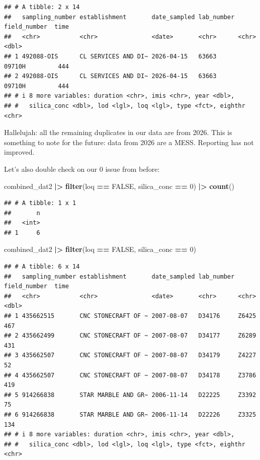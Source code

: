 \documentclass[
]{article}
\newenvironment{Shaded}{\begin{snugshade}}{\end{snugshade}}
\newcommand{\ConstantTok}[1]{\textcolor[rgb]{0.56,0.35,0.01}{#1}}
\newcommand{\DecValTok}[1]{\textcolor[rgb]{0.00,0.00,0.81}{#1}}
\newcommand{\FunctionTok}[1]{\textcolor[rgb]{0.13,0.29,0.53}{\textbf{#1}}}
\newcommand{\NormalTok}[1]{#1}
\newcommand{\SpecialCharTok}[1]{\textcolor[rgb]{0.81,0.36,0.00}{\textbf{#1}}}
\begin{document}
\begin{verbatim}
## # A tibble: 2 x 14
##   sampling_number establishment       date_sampled lab_number field_number  time
##   <chr>           <chr>               <date>       <chr>      <chr>        <dbl>
## 1 492088-OIS      CL SERVICES AND DI~ 2026-04-15   63663      09710H         444
## 2 492088-OIS      CL SERVICES AND DI~ 2026-04-15   63663      09710H         444
## # i 8 more variables: duration <chr>, imis <chr>, year <dbl>,
## #   silica_conc <dbl>, lod <lgl>, loq <lgl>, type <fct>, eighthr <chr>
\end{verbatim}

Hallelujah: all the remaining duplicates in our data are from 2026. This
is something to note for the future: data from 2026 are a MESS.
Reporting has not improved.

Let's also double check on our 0 issue from before:

\begin{Shaded}
\begin{Highlighting}[]
\NormalTok{combined\_dat2 }\SpecialCharTok{|\textgreater{}} 
  \FunctionTok{filter}\NormalTok{(loq }\SpecialCharTok{==} \ConstantTok{FALSE}\NormalTok{, }
\NormalTok{         silica\_conc }\SpecialCharTok{==} \DecValTok{0}\NormalTok{) }\SpecialCharTok{|\textgreater{}} 
  \FunctionTok{count}\NormalTok{() }
\end{Highlighting}
\end{Shaded}

\begin{verbatim}
## # A tibble: 1 x 1
##       n
##   <int>
## 1     6
\end{verbatim}

\begin{Shaded}
\begin{Highlighting}[]
\NormalTok{combined\_dat2 }\SpecialCharTok{|\textgreater{}} 
    \FunctionTok{filter}\NormalTok{(loq }\SpecialCharTok{==} \ConstantTok{FALSE}\NormalTok{, }
\NormalTok{         silica\_conc }\SpecialCharTok{==} \DecValTok{0}\NormalTok{) }
\end{Highlighting}
\end{Shaded}

\begin{verbatim}
## # A tibble: 6 x 14
##   sampling_number establishment       date_sampled lab_number field_number  time
##   <chr>           <chr>               <date>       <chr>      <chr>        <dbl>
## 1 435662515       CNC STONECRAFT OF ~ 2007-08-07   D34176     Z6425          467
## 2 435662499       CNC STONECRAFT OF ~ 2007-08-07   D34177     Z6289          431
## 3 435662507       CNC STONECRAFT OF ~ 2007-08-07   D34179     Z4227           52
## 4 435662507       CNC STONECRAFT OF ~ 2007-08-07   D34178     Z3786          419
## 5 914266838       STAR MARBLE AND GR~ 2006-11-14   D22225     Z3392           75
## 6 914266838       STAR MARBLE AND GR~ 2006-11-14   D22226     Z3325          134
## # i 8 more variables: duration <chr>, imis <chr>, year <dbl>,
## #   silica_conc <dbl>, lod <lgl>, loq <lgl>, type <fct>, eighthr <chr>
\end{verbatim}
\end{document}
